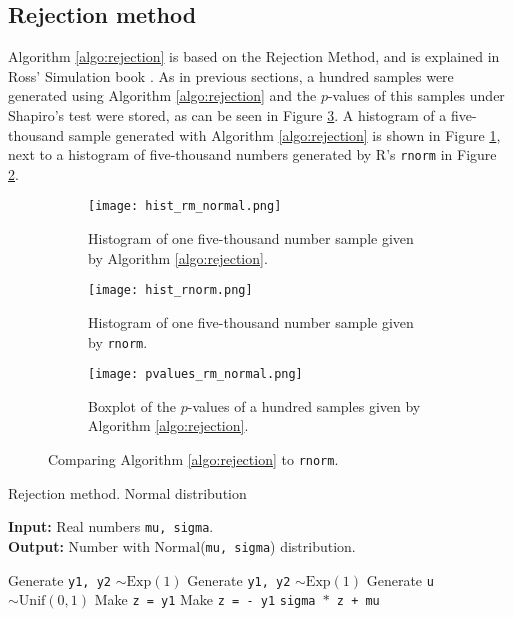 \documentclass[letterpaper, 10 pt, conference]{article}
\begin{document}
\subsection{Rejection method}
Algorithm \ref{algo:rejection} is based on the Rejection Method, and is explained in Ross' Simulation book \cite{Ross_2006}.  As in previous sections, a hundred samples were generated using Algorithm \ref{algo:rejection} and the $p$-values of this samples under Shapiro's test were stored, as can be seen in Figure \ref{fig:pvalues_rejection}. A histogram of a five-thousand sample generated with Algorithm \ref{algo:rejection} is shown in Figure \ref{fig:rejection_hist}, next to a histogram of five-thousand numbers generated by R's \texttt{rnorm} in Figure \ref{fig:rnorm_hist}.

\begin{figure}
	\centering
	\begin{subfigure}[b]{0.45\linewidth}
		\texttt{[image: hist\_rm\_normal.png]}
		\caption{Histogram of one five-thousand number sample given by Algorithm \ref{algo:rejection}.}
		\label{fig:rejection_hist}
	\end{subfigure}
	\begin{subfigure}[b]{0.45\linewidth}
		\texttt{[image: hist\_rnorm.png]}
		\caption{Histogram of one five-thousand number sample given by \texttt{rnorm}.}
		\label{fig:rnorm_hist}
	\end{subfigure}
	\begin{subfigure}[b]{0.45\linewidth}
	\texttt{[image: pvalues\_rm\_normal.png]}
	\caption{Boxplot of the $p$-values of a hundred samples given by Algorithm \ref{algo:rejection}.}
	\label{fig:pvalues_rejection}
	\end{subfigure}
	\caption{Comparing Algorithm \ref{algo:rejection} to \texttt{rnorm}. } 
	\label{fig:rejection_method}
\end{figure}


\begin{algorithm}
	\caption{Rejection method. Normal distribution}
	\begin{flushleft}
		\textbf{Input: } Real numbers \texttt{mu, sigma}.
		\\ \textbf{Output: } Number with $\mathrm{Normal}$(\texttt{mu, sigma}) distribution.
	\end{flushleft}
	
	\begin{algorithmic}[1]
		\State Generate \texttt{y1, y2} $\sim \mathrm{Exp}(1)$
			\State Generate \texttt{y1, y2} $\sim \mathrm{Exp}(1)$
		\EndWhile
		\State Generate \texttt{u} $\sim \mathrm{Unif}(0,1)$
			\State Make \texttt{z = y1}
		\Else 
			\State Make \texttt{z = - y1}
		\EndIf
		\State \Return \texttt{sigma $\ast$ z + mu}
	\end{algorithmic}
	\label{algo:rejection}
\end{algorithm}
\end{document}
